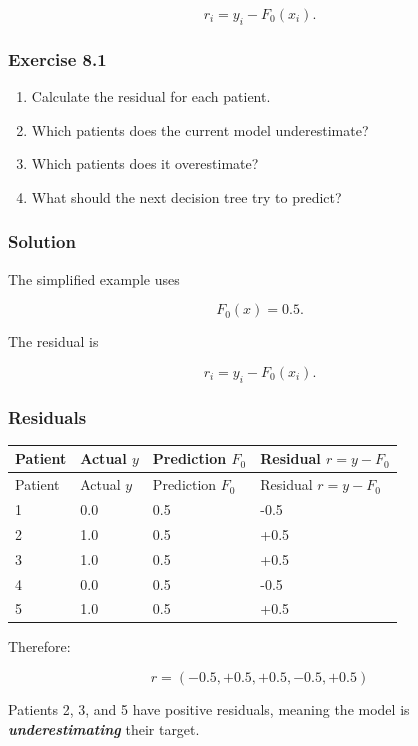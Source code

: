 \documentclass[10pt]{article}
\begin{document}
\[
r_i=y_i-F_0(x_i).
\]

\subsubsection*{Exercise 8.1}
\begin{enumerate}
\item
Calculate the residual for each patient.

\item
Which patients does the current model underestimate?

\item
Which patients does it overestimate?

\item
What should the next decision tree try to predict?

\end{enumerate}
\begingroup\color{red}

\subsubsection*{Solution}
The simplified example uses

\[
F_0(x)=0.5.
\]

The residual is

\[
r_i=y_i-F_0(x_i).
\]

\subsubsection*{Residuals}
\begingroup
\small
\setlength{\tabcolsep}{4pt}
\begin{longtable}{l|l|l|l}
Patient & Actual $y$ & Prediction $F_0$ & Residual $r=y-F_0$ \\[1.5pt]
\hline
\endfirsthead
Patient & Actual $y$ & Prediction $F_0$ & Residual $r=y-F_0$ \\[1.5pt]
\hline
\endhead
1 & 0.0 & 0.5 & -0.5 \\[1.5pt]
2 & 1.0 & 0.5 & +0.5 \\[1.5pt]
3 & 1.0 & 0.5 & +0.5 \\[1.5pt]
4 & 0.0 & 0.5 & -0.5 \\[1.5pt]
5 & 1.0 & 0.5 & +0.5 \\[1.5pt]
\end{longtable}
\endgroup
Therefore:

\[
{
r=(-0.5,+0.5,+0.5,-0.5,+0.5)
}
\]

Patients 2, 3, and 5 have positive residuals, meaning the model is \textbf{\textit{underestimating}} their target.
\end{document}
